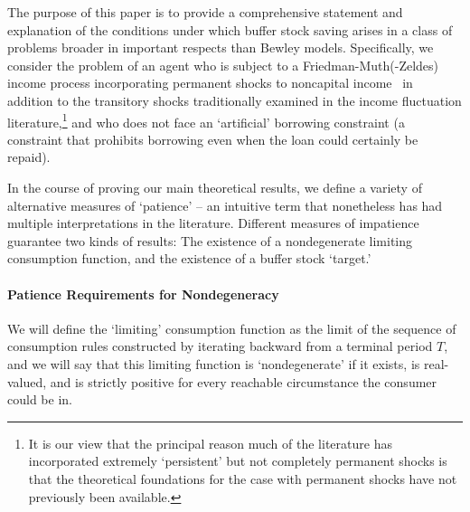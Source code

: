 \documentclass[BufferStockTheory]{subfiles}
\begin{document}
The purpose of this paper is to provide a comprehensive statement and explanation of the conditions under which buffer stock saving arises in a class of problems broader in important respects than Bewley models. Specifically, we consider the problem of an agent who is subject to a Friedman-Muth(-Zeldes) income process incorporating permanent shocks to noncapital income~\citep{friedmanATheory, muthOptimal, zeldesStochastic} in addition to the transitory shocks traditionally examined in the income fluctuation literature,\footnote{It is our view that the principal reason much of the literature has incorporated extremely `persistent' but not completely permanent shocks is that the theoretical foundations for the case with permanent shocks have not previously been available.}
and who does not face an `artificial' borrowing constraint (a constraint that prohibits borrowing even when the loan could certainly be repaid).

In the course of proving our main theoretical results, we define a variety of alternative measures of `patience' -- an intuitive term that nonetheless has had multiple interpretations in the literature. Different measures of impatience guarantee two kinds of results: The existence of a nondegenerate limiting consumption function, and the existence of a buffer stock `target.'

\paragraph{Patience Requirements for Nondegeneracy}
We will define the `limiting' consumption function as the limit of the sequence of consumption rules constructed by iterating backward from a terminal period $T$, and we will say that this limiting function is `nondegenerate' if it exists, is real-valued, and is strictly positive for every reachable circumstance the consumer could be in.



\end{document}
